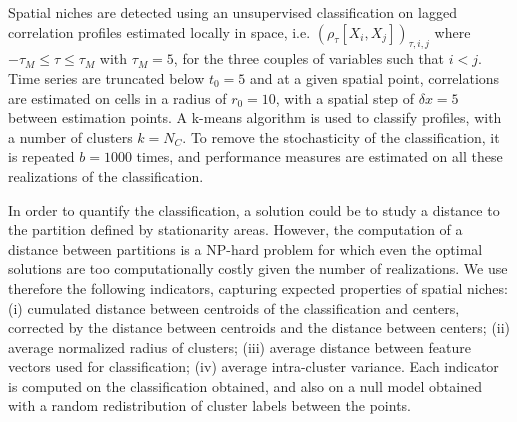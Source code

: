 \documentclass[11pt]{article}
\begin{document}
Spatial niches are detected using an unsupervised classification on lagged correlation profiles estimated locally in space, i.e. $(\rho_{\tau}\left[X_i,X_j\right])_{\tau,i,j}$ where $- \tau_M \leq \tau \leq  \tau_M$ with $\tau_M = 5$, for the three couples of variables such that $i < j$. Time series are truncated below $t_0 = 5$ and at a given spatial point, correlations are estimated on cells in a radius of  $r_0 = 10$, with a spatial step of $\delta x = 5$ between estimation points. A k-means algorithm is used to classify profiles, with a number of clusters $k = N_C$. To remove the stochasticity of the classification, it is repeated $b = 1000$ times, and performance measures are estimated on all these realizations of the classification.


In order to quantify the classification, a solution could be to study a distance to the partition defined by stationarity areas. However, the computation of a distance between partitions is a NP-hard problem \citep{day1981complexity} for which even the optimal solutions \citep{porumbel2011efficient} are too computationally costly given the number of realizations. We use therefore the following indicators, capturing expected properties of spatial niches: (i) cumulated distance between centroids of the classification and centers, corrected by the distance between centroids and the distance between centers; (ii) average normalized radius of clusters; (iii) average distance between feature vectors used for classification; (iv) average intra-cluster variance. Each indicator is computed on the classification obtained, and also on a null model obtained with a random redistribution of cluster labels between the points.
 
\end{document}
